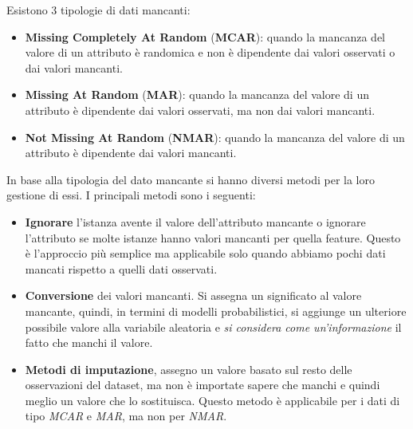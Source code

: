 Esistono 3 tipologie di dati mancanti:
\begin{itemize}
      \item \textbf{Missing Completely At Random} (\textbf{MCAR}): quando la
            mancanza del valore di un attributo è randomica e non è dipendente dai valori
            osservati o dai valori mancanti.
      \item \textbf{Missing At Random} (\textbf{MAR}): quando la mancanza del
            valore di un attributo è dipendente dai valori osservati, ma non dai
            valori mancanti.
      \item \textbf{Not Missing At Random} (\textbf{NMAR}): quando la mancanza del
            valore di un attributo è dipendente dai valori mancanti.
\end{itemize}
In base alla tipologia del dato mancante si hanno diversi metodi per la loro
gestione di essi. I principali metodi sono i seguenti:
\begin{itemize}
      \item \textbf{Ignorare} l'istanza avente il valore dell'attributo mancante o
            ignorare l'attributo se molte istanze hanno valori mancanti per quella
            feature. Questo è l'approccio più semplice ma applicabile solo quando
            abbiamo pochi dati mancati rispetto a quelli dati osservati.
      \item \textbf{Conversione} dei valori mancanti. Si assegna un significato al
            valore mancante, quindi, in termini di modelli probabilistici, si
            aggiunge un ulteriore possibile valore alla variabile aleatoria e
            \textit{si considera come un'informazione} il fatto che manchi il valore.
      \item \textbf{Metodi di imputazione}, assegno un valore basato sul resto delle
            osservazioni del dataset, ma non è importate sapere che manchi e quindi
            meglio un valore che lo sostituisca. Questo metodo è applicabile per i
            dati di tipo \textit{MCAR} e \textit{MAR}, ma non per \textit{NMAR}.
\end{itemize}
